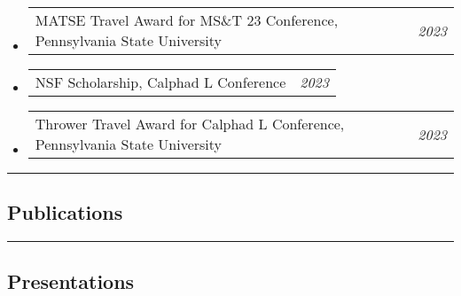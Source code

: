 \documentclass[10pt,letterpaper]{article}
\makeatletter
\newcommand{\headerrow}[2]
{\begin{tabular*}{\linewidth}{l@{\extracolsep{\fill}}r}
  #1 &
  #2 \\
\end{tabular*}}
\makeatother
\begin{document}
\begin{itemize}
  \parskip=0.1em
  \item  
  \headerrow
    {MATSE Travel Award for MS\&T 23 Conference, Pennsylvania State University} {\emph{2023}}
  \item
  \headerrow
    {NSF Scholarship, Calphad L Conference} {\emph{2023}}
  \item  
  \headerrow
    {Thrower Travel Award for Calphad L Conference, Pennsylvania State University} {\emph{2023}}
\end{itemize}


\hrule
\vspace{-0.6em}
\subsection*{Publications}



\hrule
\vspace{-0.6em}
\subsection*{Presentations}


\end{document}
